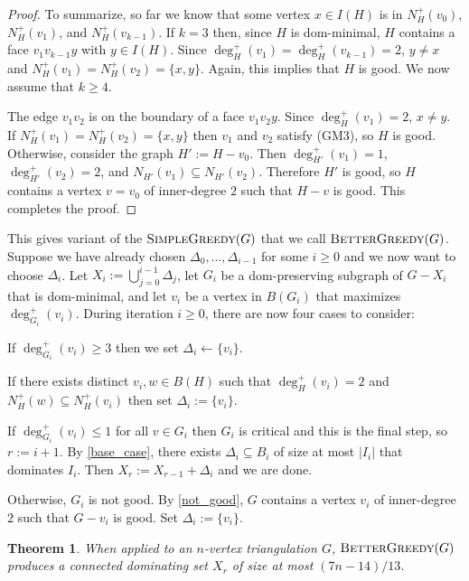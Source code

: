 \documentclass[12pt]{article}
\newtheorem{thm}{Theorem}
\begin{document}
\begin{proof}
  To summarize, so far we know that some vertex $x\in I(H)$ is in $N^+_H(v_0)$, $N^+_H(v_1)$, and $N^+_H(v_{k-1})$.  If $k=3$ then, since $H$ is dom-minimal, $H$ contains a face $v_1v_{k-1}y$ with $y\in I(H)$.  Since $\deg^+_H(v_1)=\deg^+_H(v_{k-1})=2$, $y\neq x$ and $N^+_H(v_1)=N^+_H(v_2)=\{x,y\}$. Again, this implies that $H$ is good.  We now assume that $k\ge 4$.

  The edge $v_1v_2$ is on the boundary of a face $v_1v_2y$.  Since $\deg^+_H(v_1)=2$, $x\neq y$.  If $N^+_H(v_1)=N^+_H(v_2)=\{x,y\}$ then $v_1$ and $v_2$ satisfy (GM3), so $H$ is good.  Otherwise, consider the graph $H':=H-v_0$.  Then $\deg^+_{H'}(v_1)=1$, $\deg^+_{H'}(v_2)=2$, and $N_{H'}(v_1)\subseteq N_{H'}(v_2)$.   Therefore $H'$ is good, so $H$ contains a vertex $v=v_0$ of inner-degree $2$ such that $H-v$ is good.  This completes the proof.
\end{proof}


This gives variant of the $\textsc{SimpleGreedy}(G)$ that we call $\textsc{BetterGreedy}(G)$.  Suppose we have already chosen $\Delta_0,\ldots,\Delta_{i-1}$ for some $i\ge 0$ and we now want to choose $\Delta_i$.  Let $X_i:=\bigcup_{j=0}^{i-1}\Delta_j$, let $G_i$ be a dom-preserving subgraph of $G-X_i$ that is dom-minimal, and let $v_i$ be a vertex in $B(G_i)$ that maximizes $\deg^+_{G_i}(v_i)$.  During iteration $i\ge 0$, there are now four cases to consider:
\begin{compactenum}
    \item If $\deg^+_{G_i}(v_i)\ge 3$ then we set $\Delta_i\gets\{v_i\}$.
    \item If there exists distinct $v_i,w\in B(H)$ such that $\deg^+_H(v_i)=2$ and $N^+_H(w)\subseteq N^+_H(v_i)$ then set $\Delta_i:=\{v_i\}$.
    \item If $\deg^+_{G_i}(v_i)\le 1$ for all $v\in G_i$ then $G_i$ is critical and this is the final step, so $r:=i+1$.  By \cref{base_case}, there exists $\Delta_i\subseteq B_i$ of size at most $|I_i|$ that dominates $I_i$. Then $X_r:=X_{r-1}+\Delta_{i}$ and we are done.
    \item Otherwise, $G_i$ is not good.  By \cref{not_good}, $G$ contains a vertex $v_i$ of inner-degree $2$ such that $G-v_i$ is good.  Set $\Delta_i:=\{v_i\}$.
\end{compactenum}

\begin{thm}\label{better_greedy}
  When applied to an $n$-vertex triangulation $G$,  $\textsc{BetterGreedy}(G)$ produces a connected dominating set $X_r$ of size at most $(7n-14)/13$.
\end{thm}
\end{document}
